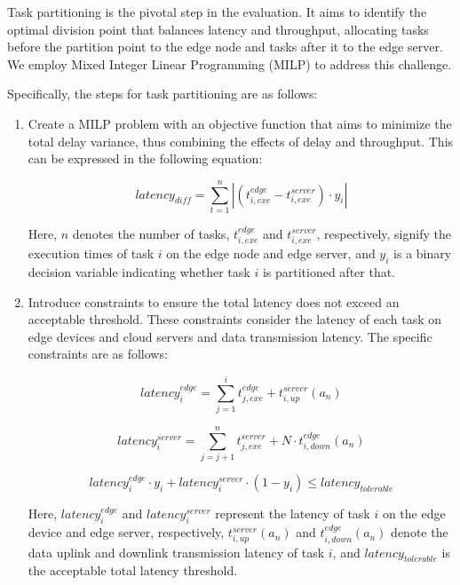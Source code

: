 \documentclass[preprint,12pt]{elsarticle}
\begin{document}
Task partitioning is the pivotal step in the evaluation. It aims to identify the optimal division point that balances latency and throughput, allocating tasks before the partition point to the edge node and tasks after it to the edge server\cite{wang2023task}. We employ Mixed Integer Linear Programming (MILP) to address this challenge.

Specifically, the steps for task partitioning are as follows:

\begin{enumerate}
    \item Create a MILP problem with an objective function that aims to minimize the total delay variance, thus combining the effects of delay and throughput. This can be expressed in the following equation:

    \begin{equation}
        latency_{diff}=\sum^n_{t=1}|(t_{i,exe}^{edge}-t_{i,exe}^{server})\cdot y_i|
    \end{equation}

    Here, \(n\) denotes the number of tasks, \(t_{i,exe}^{edge}\) and \(t_{i,exe}^{server}\), respectively, signify the execution times of task \(i\) on the edge node and edge server, and \(y_i\) is a binary decision variable indicating whether task \(i\) is partitioned after that.

    \item Introduce constraints to ensure the total latency does not exceed an acceptable threshold. These constraints consider the latency of each task on edge devices and cloud servers and data transmission latency. The specific constraints are as follows:

    \begin{equation}
    latency_i^{edge}=\sum^i_{j=1}t_{j,exe}^{edge}+t_{i,up}^{server}(a_n)
    \end{equation}

    \begin{equation}
        latency_i^{server} = \sum^n_{j=j+1}t_{j,exe}^{server}+N\cdot t_{i,down}^{edge}(a_n)
    \end{equation}
    
    \begin{equation}
        latency_i^{edge}\cdot y_i+latency_i^{server}\cdot(1-y_i)\leq latency_{tolerable}
     \end{equation}

    Here, \(latency_i^{edge}\) and \(latency_i^{server}\) represent the latency of task \(i\) on the edge device and edge server, respectively, \(t_{i,up}^{server}(a_n)\) and \(t_{i,down}^{edge}(a_n)\) denote the data uplink and downlink transmission latency of task \(i\), and \(latency_{tolerable}\) is the acceptable total latency threshold.
    
\end{enumerate}
\end{document}
